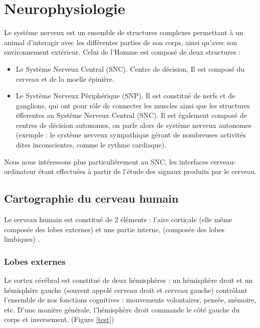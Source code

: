 \chapter{Neurophysiologie}
\label{Chapitre: Neurophysiologie}
\thispagestyle{fancy}

Le système nerveux est un ensemble de structures complexes permettant à un animal d'interagir avec les différentes parties de son corps, ainsi qu'avec son environnement extérieur. Celui de l'Homme est composé de deux structures  :

\smallbreak
\begin{itemize}
	\item Le Système Nerveux Central (SNC). Centre de décision, Il est composé du cerveau et de la moelle épinière. 
	\smallbreak
	\item Le Système Nerveux Périphérique (SNP). Il est constitué de nerfs et de ganglions, qui ont pour rôle de connecter les muscles ainsi que les structures éfferentes au Système Nerveux Central (SNC). Il est également composé de centres de décision autonomes, on parle alors de système nerveux autonomes (exemple : le système nerveux sympathique gérant de nombreuses activités dites inconscientes, comme le rythme cardiaque). 
\end{itemize}
\smallbreak
Nous nous intéressons plus particulièrement au SNC, les interfaces cerveau-ordinateur étant effectuées à partir de l'étude des signaux produits par le cerveau. 

\section {Cartographie du cerveau humain}
\label{Section: 2.Cartographie du cerveau humain}

Le cerveau humain est constitué de 2 éléments : l'aire corticale (elle même composée des lobes externes) et une partie interne, (composée des lobes limbiques) \cite{mcGill}. 

\subsection{Lobes externes}
\label{Subsection: 2.Lobes externes}
Le cortex cérébral est constitué de deux hémisphères : un hémisphère droit et un hémisphère gauche (souvent appelé cerveau droit et cerveau gauche) contrôlant l’ensemble de nos fonctions cognitives : mouvements volontaires, pensée, mémoire, etc. D’une manière générale, l’hémisphère droit commande le côté gauche du corps et inversement. (Figure \ref{test})

